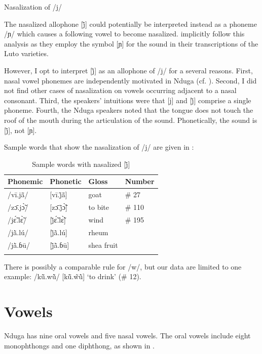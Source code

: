 \documentclass[output=paper,colorlinks,citecolor=brown
]{langscibook}
\begin{document}
\ea \label{ex:olson:nasalization}
Nasalization of /j/ \\
\z

The nasalized allophone [j̃] could potentially be interpreted instead as a phoneme /ɲ/ which causes a following vowel to become nasalized. \citet{boyeldieuetal2006} implicitly follow this analysis as they employ the symbol [ɲ] for the sound in their transcriptions of the Luto varieties.

However, I opt to interpret [j̃] as an allophone of /j/ for a several reasons. First, nasal vowel phonemes are independently motivated in Nduga (cf. ). Second, I did not find other cases of nasalization on vowels occurring adjacent to a nasal consonant. Third, the speakers’ intuitions were that [j] and [j̃] comprise a single phoneme. Fourth, the Nduga speakers noted that the tongue does not touch the roof of the mouth during the articulation of the sound. Phonetically, the sound is [j̃], not [ɲ].

Sample words that show the nasalization of /j/ are given in :

\begin{table}
\caption{Sample words with nasalized [j̃]}
\label{tab:olson:nasalizedj}
 \begin{tabular}{llll}
  \lsptoprule
    Phonemic & Phonetic & Gloss & Number\\
  \midrule
  /vī.jã̄/ & [vī.j̃ã̄] & goat & \# 27 \\
  /zɔ̄.jɔ̃̀/ & [zɔ̄.j̃ɔ̃̀] & to bite & \# 110 \\
  /jɛ̃́.lɛ̃̀/ & [j̃ɛ̃́.lɛ̃̀] & wind & \# 195 \\
  /jã̀.lú/ & [j̃ã̀.lú] & rheum & \\
  /jã̀.ɓū/ & [j̃ã̀.ɓū] & shea fruit & \\
  \lspbottomrule
 \end{tabular}
\end{table}


There is possibly a comparable rule for /w/, but our data are limited to one example: /kũ̄.wũ̀/ [kũ̄.w̃ũ̀] ‘to drink’ (\# 12).

\section{Vowels}
\label{sec:olson:vowels}

Nduga has nine oral vowels and five nasal vowels. The oral vowels include eight monophthongs and one diphthong, as shown in .
\end{document}
